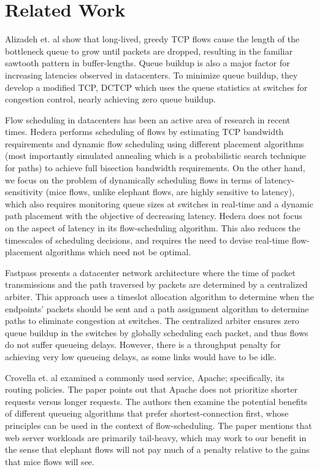 \section{Related Work}
Alizadeh et. al \cite{dctcp} show that long-lived, greedy TCP flows cause the length of the bottleneck queue to grow until packets are dropped, resulting in the familiar sawtooth pattern in buffer-lengths. Queue buildup is also a major factor for increasing latencies observed in datacenters. To minimize queue buildup, they develop a modified TCP, DCTCP which uses the queue statistics at switches for congestion control, nearly achieving zero queue buildup. 

Flow scheduling in datacenters has been an active area of research in recent times. Hedera \cite{hedera} performs scheduling of flows by estimating TCP bandwidth requirements and dynamic flow scheduling using different placement algorithms (most importantly simulated annealing which is a probabilistic search technique for paths) to achieve full bisection bandwidth requirements. On the other hand, we focus on the problem of dynamically scheduling flows in terms of latency-sensitivity (mice flows, unlike elephant flows, are highly sensitive to latency), which also requires monitoring queue sizes at switches in real-time and a dynamic path placement with the objective of decreasing latency. Hedera does not focus on the aspect of latency in its flow-scheduling algorithm. This also reduces the timescales of scheduling decisions, and requires the need to devise real-time flow-placement algorithms which need not be optimal. 

Fastpass \cite{fastpass} presents a datacenter network architecture where the time of packet transmissions and the path traversed by packets are determined by a centralized arbiter. This approach uses a timeslot allocation algorithm to determine when the endpoints' packets should be sent and a path assignment algorithm to determine paths to eliminate congestion at switches. The centralized arbiter ensures zero queue buildup in the switches by globally scheduling each packet, and thus flows do not suffer queueing delays. However, there is a throughput penalty for achieving very low queueing delays, as some links would have to be idle. 
 
 Crovella et. al \cite{CFH99} examined a commonly used service, Apache; specifically, its routing policies. The paper points out that Apache does not prioritize shorter requests versus longer requests. The authors then examine the potential benefits of different queueing algorithms that prefer shortest-connection first, whose principles can be used in the context of flow-scheduling. The paper mentions that web server workloads are primarily tail-heavy, which may work to our benefit in the sense that elephant flows will not pay much of a penalty relative to the gains that mice flows will see. 